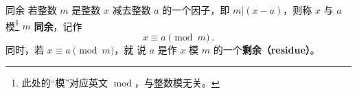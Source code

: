 
\begin{definition}{同余}
若整数 $m$ 是整数 $x$ 减去整数 $a$ 的一个因子，即 $m | (x-a)$，则称 $x$ 与 $a$ 模\footnote{此处的“模”对应英文 $\operatorname{mod}$，与整数模无关。} $m$ \textbf{同余}，记作
\begin{equation}
x \equiv a \pmod m ~.
\end{equation}
同时，若 $x \equiv a \pmod m$，就 说 $a$ 是作 $x$ 模 $m$ 的一个\textbf{剩余（residue）}。
\end{definition}



